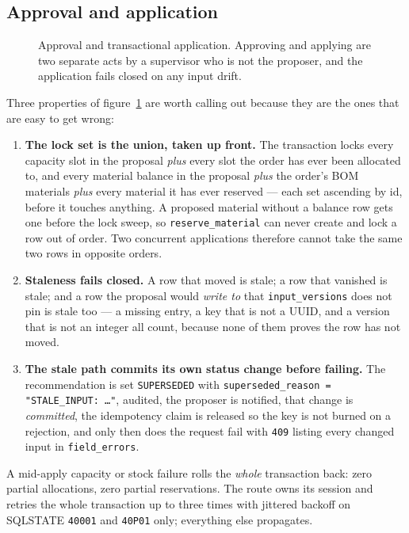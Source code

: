 \documentclass[11pt,a4paper]{article}
\begin{document}
\subsection{Approval and application}

\begin{figure}[p]
\centering
\resizebox{!}{0.9\textheight}{}
\caption{Approval and transactional application. Approving and applying are two
separate acts by a supervisor who is not the proposer, and the application fails
closed on any input drift.}
\label{fig:apply}
\end{figure}

Three properties of figure~\ref{fig:apply} are worth calling out because they
are the ones that are easy to get wrong:

\begin{enumerate}
\item \textbf{The lock set is the union, taken up front.} The transaction locks
  every capacity slot in the proposal \emph{plus} every slot the order has ever
  been allocated to, and every material balance in the proposal \emph{plus} the
  order's BOM materials \emph{plus} every material it has ever reserved --- each
  set ascending by id, before it touches anything. A proposed material without a
  balance row gets one before the lock sweep, so \texttt{reserve\_material} can
  never create and lock a row out of order. Two concurrent applications
  therefore cannot take the same two rows in opposite orders.
\item \textbf{Staleness fails closed.} A row that moved is stale; a row that
  vanished is stale; and a row the proposal would \emph{write to} that
  \texttt{input\_versions} does not pin is stale too --- a missing entry, a key
  that is not a UUID, and a version that is not an integer all count, because
  none of them proves the row has not moved.
\item \textbf{The stale path commits its own status change before failing.} The
  recommendation is set \texttt{SUPERSEDED} with
  \texttt{superseded\_reason = "STALE\_INPUT: \dots"}, audited, the proposer is
  notified, that change is \emph{committed}, the idempotency claim is released
  so the key is not burned on a rejection, and only then does the request fail
  with \texttt{409} listing every changed input in \texttt{field\_errors}.
\end{enumerate}

A mid-apply capacity or stock failure rolls the \emph{whole} transaction back:
zero partial allocations, zero partial reservations. The route owns its session
and retries the whole transaction up to three times with jittered backoff on
SQLSTATE \texttt{40001} and \texttt{40P01} only; everything else propagates.
\end{document}
